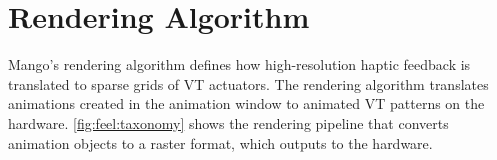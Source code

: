 %
%
%
%
%    
    
%
%
\section{Rendering Algorithm}
Mango's rendering algorithm defines how high-resolution haptic feedback is translated to %
 sparse grids of VT actuators. 
The rendering algorithm translates animations created in the animation window to animated VT patterns on the hardware.
\autoref{fig:feel:taxonomy} shows the rendering pipeline that converts animation objects to
a raster format, which outputs to the hardware.

